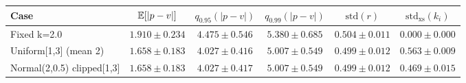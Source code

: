 \begin{tabular}{lccccc}
\hline
Case & $\mathbb{E}[|p-v|]$ & $q_{0.95}(|p-v|)$ & $q_{0.99}(|p-v|)$ & $\mathrm{std}(r)$ & $\mathrm{std}_{\mathrm{xs}}(k_i)$ \\
\hline
Fixed k=2.0 & $1.910\pm0.234$ & $4.475\pm0.546$ & $5.380\pm0.685$ & $0.504\pm0.011$ & $0.000\pm0.000$ \\
Uniform[1,3] (mean 2) & $1.658\pm0.183$ & $4.027\pm0.416$ & $5.007\pm0.549$ & $0.499\pm0.012$ & $0.563\pm0.009$ \\
Normal(2,0.5) clipped[1,3] & $1.658\pm0.183$ & $4.027\pm0.417$ & $5.007\pm0.549$ & $0.499\pm0.012$ & $0.469\pm0.015$ \\
\hline
\end{tabular}
